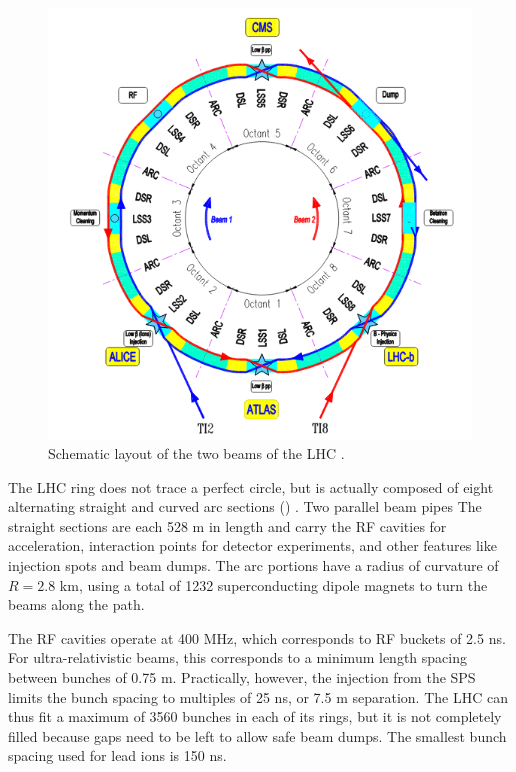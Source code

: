 \begin{figure}[t]
\includegraphics{LHC_schematic.png}
\caption{Schematic layout of the two beams of the LHC \cite{Bruning:2004ej}.}
\label{fig:lhc_schematic}
\end{figure}

The LHC ring does not trace a perfect circle, but is actually composed of eight alternating straight and curved arc sections () \cite{Bruning:2004ej}.
Two parallel beam pipes 
The straight sections are each 528 m in length and carry the RF cavities for acceleration, interaction points for detector experiments, and other features like injection spots and beam dumps.
The arc portions have a radius of curvature of $R = 2.8$ km, using a total of 1232 superconducting dipole magnets to turn the beams along the path.

The RF cavities operate at 400 MHz, which corresponds to RF buckets of 2.5 ns.
For ultra-relativistic beams, this corresponds to a minimum length spacing between bunches of 0.75 m.
Practically, however, the injection from the SPS limits the bunch spacing to multiples of 25 ns, or 7.5 m separation.
The LHC can thus fit a maximum of 3560 bunches in each of its rings, but it is not completely filled because gaps need to be left to allow safe beam dumps.
The smallest bunch spacing used for lead ions is 150 ns.

